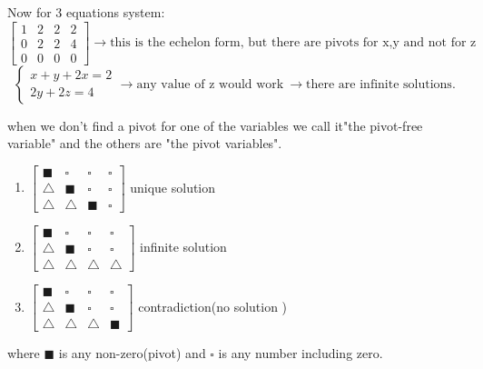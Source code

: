 \documentclass{article}
\begin{document}
Now for 3 equations system:
\[
\begin{bmatrix}
    1&2&2&2\\ 0&2&2&4\\ 0&0&0&0
\end{bmatrix} \rightarrow \text{this is the echelon form, but there are pivots for x,y and not for z}
\]
\[
\begin{cases}
    x+y+2x=2 \\ 2y+2z=4
\end{cases} \rightarrow \text{any value of z would work}\ \rightarrow \text{there are infinite solutions.}\ 
\]
\begin{note}
    when we don't find a pivot for one of the variables we call it"the pivot-free variable" and the others are "the pivot variables".
\end{note}

\begin{enumerate}
    \item   
    $\begin{bmatrix}
        \blacksquare & \square & \square& \square\\
        \triangle & \blacksquare & \square& \square\\
        \triangle & \triangle &   \blacksquare& \square
    \end{bmatrix}$ \textrightarrow unique solution 
    \item 
     $\begin{bmatrix}
        \blacksquare & \square & \square& \square\\
        \triangle & \blacksquare & \square& \square\\
        \triangle & \triangle &\triangle & \triangle 
    \end{bmatrix}$ \textrightarrow infinite solution 
    \item
     $\begin{bmatrix}
        \blacksquare & \square & \square& \square\\
        \triangle & \blacksquare & \square& \square\\
        \triangle & \triangle &  \triangle & \blacksquare
    \end{bmatrix}$ \textrightarrow contradiction(no solution )
\end{enumerate}
where $\blacksquare$ is any non-zero(pivot) and  $\square$ is any number including zero.
\end{document}
